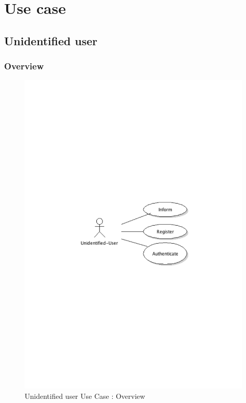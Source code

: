 \chapter{Use case}

\section{Unidentified user}
	\subsection{Overview}
		\begin{figure}[ht]
			\begin{center}
				\includegraphics[width=\textwidth,  trim=2cm 12cm 2cm 11cm]{UML_figure/UC/uni_user/UC_UniUser_General.pdf}
				\caption{Unidentified user Use Case : Overview}
			\end{center}
		\end{figure}
